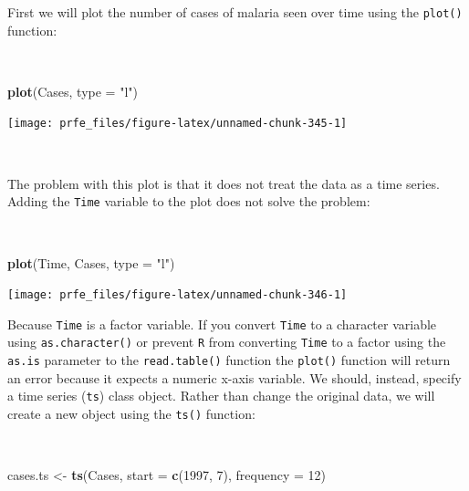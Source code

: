 \documentclass[12pt,a4paper]{book}
\newenvironment{Shaded}{\begin{snugshade}}{\end{snugshade}}
\newcommand{\DataTypeTok}[1]{\textcolor[rgb]{0.13,0.29,0.53}{#1}}
\newcommand{\DecValTok}[1]{\textcolor[rgb]{0.00,0.00,0.81}{#1}}
\newcommand{\KeywordTok}[1]{\textcolor[rgb]{0.13,0.29,0.53}{\textbf{#1}}}
\newcommand{\NormalTok}[1]{#1}
\newcommand{\StringTok}[1]{\textcolor[rgb]{0.31,0.60,0.02}{#1}}
\theoremstyle{definition}
\theoremstyle{definition}
\theoremstyle{definition}
\theoremstyle{remark}
\begin{document}
\newpage

First we will plot the number of cases of malaria seen over time using
the \texttt{plot()} function:

~

\begin{Shaded}
\begin{Highlighting}[]
\KeywordTok{plot}\NormalTok{(Cases, }\DataTypeTok{type =} \StringTok{"l"}\NormalTok{)}
\end{Highlighting}
\end{Shaded}

\begin{center}\texttt{[image: prfe\_files/figure-latex/unnamed-chunk-345-1]} \end{center}

~

The problem with this plot is that it does not treat the data as a time
series. Adding the \texttt{Time} variable to the plot does not solve the
problem:

~

\begin{Shaded}
\begin{Highlighting}[]
\KeywordTok{plot}\NormalTok{(Time, Cases, }\DataTypeTok{type =} \StringTok{"l"}\NormalTok{)}
\end{Highlighting}
\end{Shaded}

\begin{center}\texttt{[image: prfe\_files/figure-latex/unnamed-chunk-346-1]} \end{center}

\newpage

Because \texttt{Time} is a factor variable. If you convert \texttt{Time}
to a character variable using \texttt{as.character()} or prevent
\texttt{R} from converting \texttt{Time} to a factor using the
\texttt{as.is} parameter to the \texttt{read.table()} function the
\texttt{plot()} function will return an error because it expects a
numeric x-axis variable. We should, instead, specify a time series
(\texttt{ts}) class object. Rather than change the original data, we
will create a new object using the \texttt{ts()} function:

~

\begin{Shaded}
\begin{Highlighting}[]
\NormalTok{cases.ts <-}\StringTok{ }\KeywordTok{ts}\NormalTok{(Cases, }\DataTypeTok{start =} \KeywordTok{c}\NormalTok{(}\DecValTok{1997}\NormalTok{, }\DecValTok{7}\NormalTok{), }\DataTypeTok{frequency =} \DecValTok{12}\NormalTok{)}
\end{Highlighting}
\end{Shaded}
\end{document}
